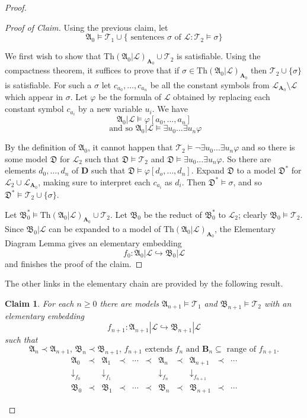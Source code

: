 \documentclass[titlepage, oneside]{amsbook}
\theoremstyle{plain}
\newtheorem*{claim}{Claim}
\theoremstyle{definition}
\theoremstyle{remark}
\newcommand{\Th}{\ensuremath{\mbox{Th}}}
\newcommand{\theory}{\ensuremath{\mathcal{T}}}
\newcommand{\lan}{\ensuremath{\mathcal{L}}}
\newcommand{\seq}{\ensuremath{\subseteq}}
\newcommand{\ma}{\ensuremath{\mathfrak{A}}}
\newcommand{\mb}{\ensuremath{\mathfrak{B}}}
\newcommand{\md}{\ensuremath{\mathfrak{D}}}
\newcommand{\ba}{\ensuremath{\mathbf{A}}}
\newcommand{\bb}{\ensuremath{\mathbf{B}}}
\newcommand{\bd}{\ensuremath{\mathbf{D}}}
\newcommand{\exu}[2][0]{\ensuremath{\exists u_{#1}  \dots  \exists   
u_{#2}}}
\newcommand{\anot}[2][0]{\ensuremath{ a_{#1} , \dots , a_{#2}}}
\begin{document}
\begin{proof}
\begin{proof}[Proof of Claim] Using the previous claim, let 
\[\ma_0 \models \theory_1 \cup \{ \mbox{ sentences } \sigma \mbox{ of }
\lan :\theory_2 \models \sigma \} \]

We first wish to show that $\Th (\ma_0 |\lan)_{\ba_0} \cup
\theory_2$ is satisfiable. Using the compactness
theorem, it suffices to prove that if $\sigma \in \Th (\ma_0 |\lan
)_{\ba_0}$ then $\theory_2 \cup \{ \sigma \} $ is satisfiable. For such
a $\sigma$ let $c_{a_0},\dots , c_{a_n}$ be all the constant symbols from
$\lan_{\ba_0} \setminus \lan$ which appear in $\sigma$.
Let $\varphi$
be the formula of $\lan$ obtained by replacing each constant symbol
$c_{a_i}$ by a new variable $u_i$.  We have \[\ma_0 |\lan \models \varphi [
\anot{n} ] \]
\[ \mbox{ and so } \ma_0 |\lan \models \exu{n} \varphi \]

By the definition of $\ma_0$, it cannot happen that $\theory_2 \models
\neg \exu{n} \varphi$ and so there is some
model $\md$ for $\lan_2$ such that $\md \models \theory_2$ and $\md
\models 
\exu{n} \varphi$. So there are elements $d_0, \dots ,d_n$ of $\bd$
such that $\md \models \varphi [ d_o , \dots , d_n ]$.  Expand $\md$ to a model
$\md^{\ast}$
for $\lan_2 \cup \lan_{\ba_0}$, making sure to interpret each $c_{a_i}$
as $d_i$. Then $\md^{\ast} \models \sigma$, and so $\md^{\ast} \models
\theory_2 \cup \{ \sigma \}$.

Let $\mb_{0}^{\ast} \models \Th (\ma_0 |\lan )_{\ba_0} \cup
\theory_2$. 
Let $\mb_0$ be the reduct of $\mb_{0}^{\ast}$ to $\lan_2$; clearly $\mb_0
\models \theory_2$.  Since $\mb_0 |\lan$ can be expanded to a model  of
$\Th (\ma_0 |\lan )_{\ba_0}$, the Elementary Diagram Lemma gives an
elementary embedding \[ f_0 : \ma_0 |\lan \hookrightarrow \mb_0
|\lan \] and
finishes the proof of the claim.

\renewcommand{\qedsymbol}{}
\end{proof}

The other links  in the elementary chain are  provided by the following
result.

\begin{claim} For each $n \geq 0$ there are models $\ma_{n+1} \models
\theory_1$ and $\mb_{n+1} \models \theory_2$ with an elementary
embedding 
\[ f_{n+1} : \ma_{n+1} | \lan \hookrightarrow \mb_{n+1} 
| {\lan} \]  such that 
\[ \ma_n \prec \ma_{n+1} , \, \mb_n \prec \mb_{n+1}, \, f_{n+1}
\mbox{ extends } f_n \mbox{ and } \bb_n \seq \mbox{ range of }
f_{n+1}.\]
\[
\begin{array}{ccccccccccc}
\ma_0 &\prec &\ma_1 &\prec &\cdots &\prec &\ma_n &\prec &\ma_{n+1}
&\prec &\cdots \\
\downarrow_{f_0} &{} &\downarrow_{f_1} &{} &{} &{} &\downarrow_{f_n}
&{} &\downarrow_{f_{n+1}} &{} &{} \\
\mb_0 &\prec &\mb_1 &\prec &\cdots &\prec &\mb_n &\prec &\mb_{n+1}
&\prec &\cdots 
\end{array}
\]


\end{claim}
\end{proof}
\end{document}
